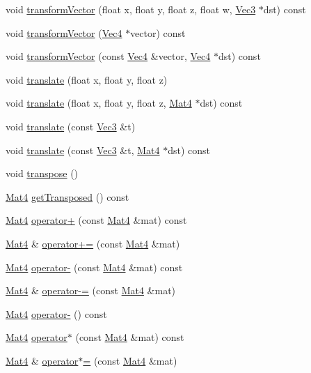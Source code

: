 \begin{DoxyCompactItemize}
\item 
void \hyperlink{classMat4_a61a1ba4cf3f23320cf351137bef9fc75}{transform\+Vector} (float x, float y, float z, float w, \hyperlink{classVec3}{Vec3} $\ast$dst) const
\item 
void \hyperlink{classMat4_a2c78f362e212324aa1ec085aefc07b78}{transform\+Vector} (\hyperlink{classVec4}{Vec4} $\ast$vector) const
\item 
void \hyperlink{classMat4_ac710d11704a735e831671574b5e1d7aa}{transform\+Vector} (const \hyperlink{classVec4}{Vec4} \&vector, \hyperlink{classVec4}{Vec4} $\ast$dst) const
\item 
void \hyperlink{classMat4_a09a0ca603f65a1c1c79ecfb5aca40025}{translate} (float x, float y, float z)
\item 
void \hyperlink{classMat4_a8b6185d434fa5a2308ea905f4ba6e233}{translate} (float x, float y, float z, \hyperlink{classMat4}{Mat4} $\ast$dst) const
\item 
void \hyperlink{classMat4_a651029cb9f07ca74d0ddc3b28689b35c}{translate} (const \hyperlink{classVec3}{Vec3} \&t)
\item 
void \hyperlink{classMat4_a7022f7bcb5a6b22d7fa86cfe908c6d91}{translate} (const \hyperlink{classVec3}{Vec3} \&t, \hyperlink{classMat4}{Mat4} $\ast$dst) const
\item 
void \hyperlink{classMat4_af8b85ea76f3b7225ee33878029b1d18e}{transpose} ()
\item 
\hyperlink{classMat4}{Mat4} \hyperlink{classMat4_a483b4b6142791d63aad164d917bfcdb8}{get\+Transposed} () const
\item 
\hyperlink{classMat4}{Mat4} \hyperlink{classMat4_aec8e42aec11573c62fd771cadec2c833}{operator+} (const \hyperlink{classMat4}{Mat4} \&mat) const
\item 
\hyperlink{classMat4}{Mat4} \& \hyperlink{classMat4_ae3b797f9d036f0dbe605d73e5bd46cfa}{operator+=} (const \hyperlink{classMat4}{Mat4} \&mat)
\item 
\hyperlink{classMat4}{Mat4} \hyperlink{classMat4_ae56d2c741f3bafc30024da58083bb8f4}{operator-\/} (const \hyperlink{classMat4}{Mat4} \&mat) const
\item 
\hyperlink{classMat4}{Mat4} \& \hyperlink{classMat4_a2cf11f93e2f8f493ade62f8bd3a849db}{operator-\/=} (const \hyperlink{classMat4}{Mat4} \&mat)
\item 
\hyperlink{classMat4}{Mat4} \hyperlink{classMat4_a23ddc905ed3d3400c62cb6f60f8577e2}{operator-\/} () const
\item 
\hyperlink{classMat4}{Mat4} \hyperlink{classMat4_adfc2da7f18cf258791b388bf3333d7ef}{operator$\ast$} (const \hyperlink{classMat4}{Mat4} \&mat) const
\item 
\hyperlink{classMat4}{Mat4} \& \hyperlink{classMat4_ab51d6459570c1632d92aa34d893be343}{operator$\ast$=} (const \hyperlink{classMat4}{Mat4} \&mat)
\end{DoxyCompactItemize}
